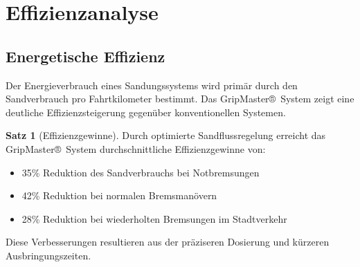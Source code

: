 \documentclass[a4paper,12pt]{article}
\theoremstyle{definition}
\newtheorem{satz}{Satz}
\theoremstyle{remark}
\begin{document}
\section{Effizienzanalyse}

\subsection{Energetische Effizienz}

Der Energieverbrauch eines Sandungssystems wird primär durch den Sandverbrauch pro Fahrtkilometer bestimmt. Das GripMaster®~System zeigt eine deutliche Effizienzsteigerung gegenüber konventionellen Systemen.

\begin{satz}[Effizienzgewinne]
	Durch optimierte Sandflussregelung erreicht das GripMaster®~System durchschnittliche Effizienzgewinne von:
	\begin{itemize}
		\item 35\% Reduktion des Sandverbrauchs bei Notbremsungen
		\item 42\% Reduktion bei normalen Bremsmanövern
		\item 28\% Reduktion bei wiederholten Bremsungen im Stadtverkehr
	\end{itemize}
	Diese Verbesserungen resultieren aus der präziseren Dosierung und kürzeren Ausbringungszeiten.
\end{satz}
\end{document}
